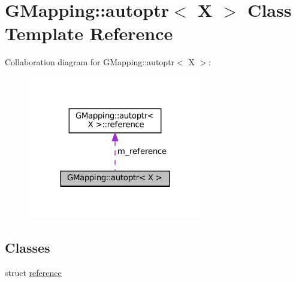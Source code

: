\hypertarget{classGMapping_1_1autoptr}{}\section{G\+Mapping\+:\+:autoptr$<$ X $>$ Class Template Reference}
\label{classGMapping_1_1autoptr}


Collaboration diagram for G\+Mapping\+:\+:autoptr$<$ X $>$\+:
\nopagebreak
\begin{figure}[H]
\begin{center}
\leavevmode
\includegraphics[width=216pt]{classGMapping_1_1autoptr__coll__graph}
\end{center}
\end{figure}
\subsection*{Classes}
\begin{DoxyCompactItemize}
\item 
struct \hyperlink{structGMapping_1_1autoptr_1_1reference}{reference}
\end{DoxyCompactItemize}
